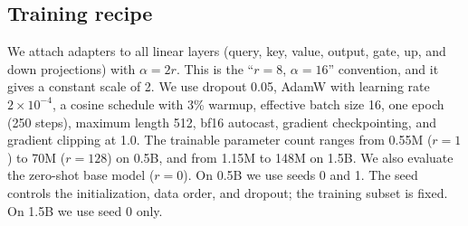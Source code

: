 \begin{table}[t]
    \centering
    \caption{Tasks. Each training set has 4,000 examples. Classification accuracy takes the argmax over the first tokens of the label words. Generative tasks use greedy decoding.}
    \label{tab:tasks}
\end{table}

\subsection{Training recipe}
We attach \lora adapters to all linear layers (query, key, value, output, gate, up, and down projections) with $\alpha = 2r$. This is the ``$r{=}8$, $\alpha{=}16$'' convention, and it gives a constant scale of 2. We use dropout 0.05, AdamW with learning rate $2\times10^{-4}$, a cosine schedule with 3\% warmup, effective batch size 16, one epoch (250 steps), maximum length 512, bf16 autocast, gradient checkpointing, and gradient clipping at 1.0. The trainable parameter count ranges from 0.55M ($r{=}1$) to 70M ($r{=}128$) on 0.5B, and from 1.15M to 148M on 1.5B. We also evaluate the zero-shot base model ($r{=}0$). On 0.5B we use seeds 0 and 1. The seed controls the \lora initialization, data order, and dropout; the training subset is fixed. On 1.5B we use seed 0 only.

